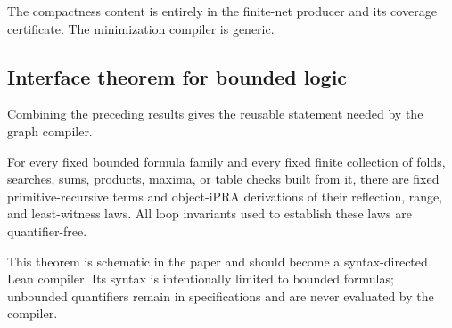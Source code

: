 The compactness content is entirely in the finite-net producer and its coverage certificate.  The minimization compiler is generic.

\subsection{Interface theorem for bounded logic}

Combining the preceding results gives the reusable statement needed by the graph compiler.

\begin{theorem}
\label{thm:bounded-interface}
For every fixed bounded formula family and every fixed finite collection of folds, searches, sums, products, maxima, or table checks built from it, there are fixed primitive-recursive terms and object-iPRA derivations of their reflection, range, and least-witness laws.  All loop invariants used to establish these laws are quantifier-free.
\end{theorem}

This theorem is schematic in the paper and should become a syntax-directed Lean compiler.  Its syntax is intentionally limited to bounded formulas; unbounded quantifiers remain in specifications and are never evaluated by the compiler.

